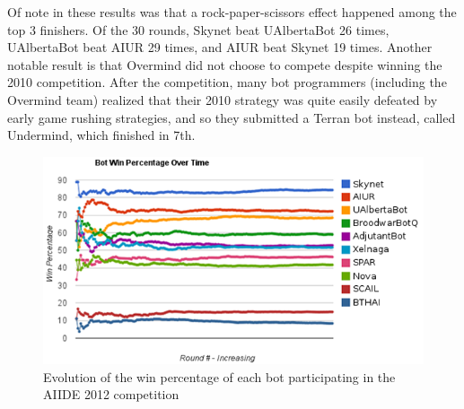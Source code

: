 \documentclass{llncs}
\begin{document}
Of  note  in  these  results  was that  a  rock-paper-scissors  effect
happened among  the top  3 finishers.  Of  the 30 rounds,  Skynet beat
UAlbertaBot 26  times, UAlbertaBot beat  AIUR 29 times, and  AIUR beat
Skynet  19 times.   Another notable  result is  that Overmind  did not
choose  to compete despite  winning the  2010 competition.   After the
competition,  many  bot  programmers  (including  the  Overmind  team)
realized that their  2010 strategy was quite easily  defeated by early
game rushing strategies,  and so they submitted a  Terran bot instead,
called Undermind, which finished in 7th.


\begin{figure}[t!]
    \centering
    \includegraphics[width=\columnwidth]{figures/aiide2012_v2}
    \caption{Evolution of the win percentage of each bot participating in the AIIDE 2012 competition}
    \label{fig:aiide2012}
\end{figure}
\end{document}
